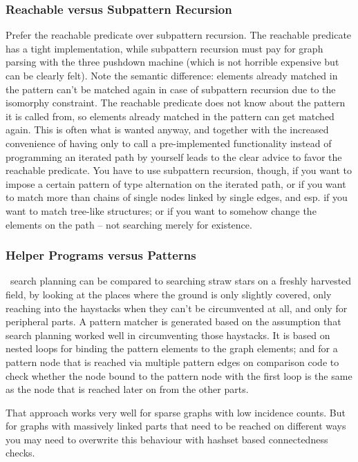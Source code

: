 \subsubsection*{Reachable versus Subpattern Recursion}
Prefer the reachable predicate over subpattern recursion.
The reachable predicate has a tight implementation, while subpattern recursion must pay for graph parsing with the three pushdown machine (which is not horrible expensive but can be clearly felt).
Note the semantic difference: elements already matched in the pattern can't be matched again in case of subpattern recursion due to the isomorphy constraint. 
The reachable predicate does not know about the pattern it is called from, so elements already matched in the pattern can get matched again.
This is often what is wanted anyway, and together with the increased convenience of having only to call a pre-implemented functionality instead of programming an iterated path by yourself leads to the clear advice to favor the reachable predicate.
You have to use subpattern recursion, though, if you want to impose a certain pattern of type alternation on the iterated path, 
or if you want to match more than chains of single nodes linked by single edges, and esp. if you want to match tree-like structures;
or if you want to somehow change the elements on the path -- not searching merely for existence.

\subsubsection*{Helper Programs versus Patterns}
\GrG\ search planning can be compared to searching straw stars on a freshly harvested field,
by looking at the places where the ground is only slightly covered, only reaching into the haystacks when
they can't be circumvented at all, and only for peripheral parts.
A pattern matcher is generated based on the assumption that search planning worked well in circumventing those haystacks. 
It is based on nested loops for binding the pattern elements to the graph elements;
and for a pattern node that is reached via multiple pattern edges on
comparison code to check whether the node bound to the pattern node with the first loop
is the same as the node that is reached later on from the other parts. 

That approach works very well for sparse graphs with low incidence counts.
But for graphs with massively linked parts that need to be reached on different ways you may need to overwrite this behaviour with hashset based connectedness checks.

